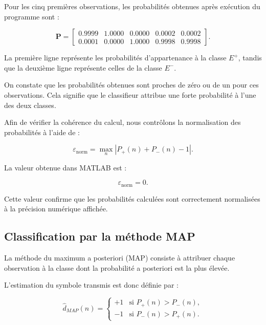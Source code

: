 Pour les cinq premières observations, les probabilités
obtenues après exécution du programme sont :

\begin{equation}
\mathbf{P}=
\begin{bmatrix}
0.9999 & 1.0000 & 0.0000 & 0.0002 & 0.0002\\
0.0001 & 0.0000 & 1.0000 & 0.9998 & 0.9998
\end{bmatrix}.
\end{equation}

La première ligne représente les probabilités
d'appartenance à la classe $E^+$, tandis que la deuxième
ligne représente celles de la classe $E^-$.

On constate que les probabilités obtenues sont proches
de zéro ou de un pour ces observations. Cela signifie
que le classifieur attribue une forte probabilité à
l'une des deux classes.

Afin de vérifier la cohérence du calcul, nous contrôlons
la normalisation des probabilités à l'aide de :

\begin{equation}
\varepsilon_{\mathrm{norm}}=
\max_n\left|
P_+(n)+P_-(n)-1
\right|.
\end{equation}

La valeur obtenue dans MATLAB est :

\begin{equation}
\boxed{
\varepsilon_{\mathrm{norm}}=0.
}
\end{equation}

Cette valeur confirme que les probabilités calculées
sont correctement normalisées à la précision numérique
affichée.

\subsection{Classification par la méthode MAP}

La méthode du maximum a posteriori (MAP) consiste à
attribuer chaque observation à la classe dont la
probabilité a posteriori est la plus élevée.

L'estimation du symbole transmis est donc définie par :

\begin{equation}
\boxed{
\widehat{d}_{MAP}(n)=
\begin{cases}
+1 & \text{si } P_+(n)>P_-(n),\\
-1 & \text{si } P_-(n)>P_+(n).
\end{cases}
}
\end{equation}

